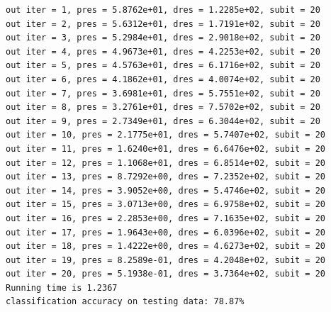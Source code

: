 \documentclass[12pt]{article}
\begin{document}
\begin{verbatim}
out iter = 1, pres = 5.8762e+01, dres = 1.2285e+02, subit = 20
out iter = 2, pres = 5.6312e+01, dres = 1.7191e+02, subit = 20
out iter = 3, pres = 5.2984e+01, dres = 2.9018e+02, subit = 20
out iter = 4, pres = 4.9673e+01, dres = 4.2253e+02, subit = 20
out iter = 5, pres = 4.5763e+01, dres = 6.1716e+02, subit = 20
out iter = 6, pres = 4.1862e+01, dres = 4.0074e+02, subit = 20
out iter = 7, pres = 3.6981e+01, dres = 5.7551e+02, subit = 20
out iter = 8, pres = 3.2761e+01, dres = 7.5702e+02, subit = 20
out iter = 9, pres = 2.7349e+01, dres = 6.3044e+02, subit = 20
out iter = 10, pres = 2.1775e+01, dres = 5.7407e+02, subit = 20
out iter = 11, pres = 1.6240e+01, dres = 6.6476e+02, subit = 20
out iter = 12, pres = 1.1068e+01, dres = 6.8514e+02, subit = 20
out iter = 13, pres = 8.7292e+00, dres = 7.2352e+02, subit = 20
out iter = 14, pres = 3.9052e+00, dres = 5.4746e+02, subit = 20
out iter = 15, pres = 3.0713e+00, dres = 6.9758e+02, subit = 20
out iter = 16, pres = 2.2853e+00, dres = 7.1635e+02, subit = 20
out iter = 17, pres = 1.9643e+00, dres = 6.0396e+02, subit = 20
out iter = 18, pres = 1.4222e+00, dres = 4.6273e+02, subit = 20
out iter = 19, pres = 8.2589e-01, dres = 4.2048e+02, subit = 20
out iter = 20, pres = 5.1938e-01, dres = 3.7364e+02, subit = 20
Running time is 1.2367
classification accuracy on testing data: 78.87%
\end{verbatim}
$$
$$
\end{document}
